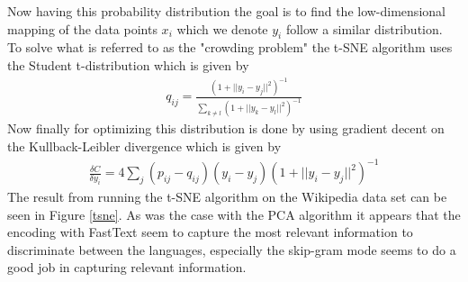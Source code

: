 Now having this probability distribution the goal is to find the low-dimensional mapping of the data points $x_i$ which we denote $y_i$ follow a similar distribution. To solve what is referred to as the "crowding problem" the t-SNE algorithm uses the Student t-distribution which is given by
\begin{align}
q_{ij}= \frac{ (1+|| y_i - y_j ||^2 )^{-1}}{\sum_{k\neq l} (1+|| y_k - y_l ||^2 )^{-1}}
\end{align}
Now finally for optimizing this distribution is done by using gradient decent on the Kullback-Leibler divergence which is given by
\begin{align}
\frac{\delta C}{\delta y_i}= 4 \sum_j (p_{ij} - q_{ij})(y_i-y_j)(1+ || y_i - y_j ||^2  )^{-1}
\end{align}
The result from running the t-SNE algorithm on the Wikipedia data set can be seen in Figure \ref{tsne}. As was the case with the PCA algorithm it appears that the encoding with FastText seem to capture the most relevant information to discriminate between the languages, especially the skip-gram mode seems to do a good job in capturing relevant information.

